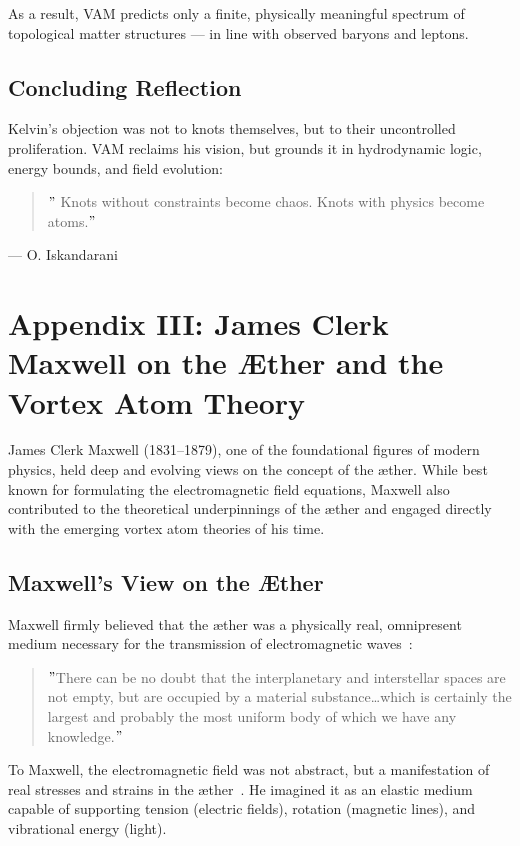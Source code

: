 \documentclass[preprint,notitlepage]{revtex4-2}
\begin{document}
    As a result, VAM predicts only a finite, physically meaningful spectrum of topological matter structures — in line with observed baryons and leptons.

    \subsection*{Concluding Reflection}

    Kelvin's objection was not to knots themselves, but to their uncontrolled proliferation. VAM reclaims his vision, but grounds it in hydrodynamic logic, energy bounds, and field evolution:

    \begin{quote}
     \("\) Knots without constraints become chaos. Knots with physics become atoms.\("\)
    \end{quote}
   \hfill — O. Iskandarani

\section*{Appendix III: James Clerk Maxwell on the Æther and the Vortex Atom Theory}
\label{appendix:maxwell}

    James Clerk Maxwell (1831–1879), one of the foundational figures of modern physics, held deep and evolving views on the concept of the æther. While best known for formulating the electromagnetic field equations, Maxwell also contributed to the theoretical underpinnings of the æther and engaged directly with the emerging vortex atom theories of his time.

    \subsection*{Maxwell's View on the Æther}
    Maxwell firmly believed that the æther was a physically real, omnipresent medium necessary for the transmission of electromagnetic waves~\cite{maxwell1878britannica}:

    \begin{quote}
    \("\)There can be no doubt that the interplanetary and interstellar spaces are not empty, but are occupied by a material substance\ldots which is certainly the largest and probably the most uniform body of which we have any knowledge.\("\)
    \end{quote}

    To Maxwell, the electromagnetic field was not abstract, but a manifestation of real stresses and strains in the æther~\cite{maxwell1878britannica}. He imagined it as an elastic medium capable of supporting tension (electric fields), rotation (magnetic lines), and vibrational energy (light).
\end{document}

